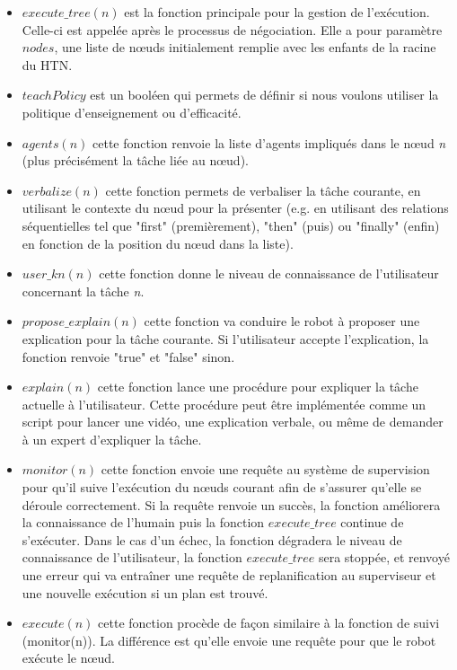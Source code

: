 \documentclass[a4paper,11pt,twoside]{StyleThese}
\begin{document}
\begin{itemize}
\item \textit{$execute\_tree(n)$} est la fonction principale pour la gestion de l'exécution. Celle-ci est appelée après le processus de négociation. Elle a pour paramètre \textit{$nodes$}, une liste de nœuds initialement remplie avec les enfants de la racine du HTN.
\item \textit{$teachPolicy$} est un booléen qui permets de définir si nous voulons utiliser la politique d'enseignement ou d'efficacité.
\item \textit{$agents(n)$} cette fonction renvoie la liste d'agents impliqués dans le nœud \textit{n} (plus précisément la tâche liée au nœud).
\item \textit{$verbalize(n)$} cette fonction permets de verbaliser la tâche courante, en utilisant le contexte du nœud pour la présenter (e.g. en utilisant des relations séquentielles tel que "first" (premièrement), "then" (puis) ou "finally" (enfin) en fonction de la position du nœud dans la liste).
\item \textit{$user\_kn(n)$} cette fonction donne le niveau de connaissance de l'utilisateur concernant la tâche \textit{n}.
\item \textit{$propose\_explain(n)$} cette fonction va conduire le robot à proposer une explication pour la tâche courante. Si l'utilisateur accepte l'explication, la fonction renvoie "true" et "false" sinon.
\item \textit{$explain(n)$} cette fonction lance une procédure pour expliquer la tâche actuelle à l'utilisateur. Cette procédure peut être implémentée comme un script pour lancer une vidéo, une explication verbale, ou même de demander à un expert d'expliquer la tâche.
\item \textit{$monitor(n)$} cette fonction envoie une requête au système de supervision pour qu'il suive l'exécution du nœuds courant afin de s'assurer qu'elle se déroule correctement. Si la requête renvoie un succès, la fonction améliorera la connaissance de l'humain puis la fonction \textit{$execute\_tree$} continue de s'exécuter. Dans le cas d'un échec, la fonction dégradera le niveau de connaissance de l'utilisateur, la fonction \textit{$execute\_tree$} sera stoppée, et renvoyé une erreur qui va entraîner une requête de replanification au superviseur et une nouvelle exécution si un plan est trouvé.
\item \textit{$execute(n)$} cette fonction procède de façon similaire à la fonction de suivi (monitor(n)). La différence est qu'elle envoie une requête pour que le robot exécute le nœud.
\end{itemize}
 
\end{document}
